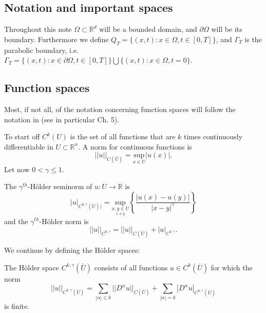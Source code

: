 \documentclass[11pt, a4paper]{article}
\begin{document}
\newpage
\begin{appendices}
\section{Notation and important spaces}
Throughout this note $\Omega \subset \mathbb{R}^d$ will be a bounded domain, and $\partial \Omega$ will be its boundary. Furthermore we define $Q_T = \{ (x,t): x \in \Omega, t\in [0,T] \}$, and $\Gamma_T$ is the parabolic boundary, i.e. $\Gamma_T = \{(x,t): x \in \partial \Omega, t \in [0,T]\} \bigcup \{(x,t): x \in \Omega, t=0\}$.

\subsection{Function spaces}
Most, if not all, of the notation concerning function spaces will follow the notation in \citep{evans} (see in particular Ch. 5).

To start off $C^k(U)$ is the set of all functions that are $k$ times continuously differentiable in $U \subset \mathbb{R}^n$. A norm for continuous functions is
\begin{equation*}
	||u||_{C(\bar{U})} = \underset{x\in U}{\text{sup}}|u(x)|.
\end{equation*}
Let now $0 < \gamma \leq 1$.
\begin{mydef}
The $\gamma^{th}$-Hölder seminorm of $u: U \to \mathbb{R}$ is
	\begin{equation*}
	|u|_{C^{0,\gamma}(\bar{U}))} = \underset{\underset{x \neq y}{x,y \in U}}{\text{sup}} \left\{\frac{|u(x)-u(y)|}{|x-y|^\gamma} \right\}
	\end{equation*}
and the $\gamma^{th}$-Hölder norm is
\begin{equation*}
||u||_{C^{0,\gamma}} = ||u||_{C(\bar{U})} + |u|_{C^{0,\gamma}}.
\end{equation*}
\end{mydef}
We continue by defining the Hölder spaces:
\begin{mydef}
The Hölder space $C^{k,\gamma}(\bar{U})$ consists of all functions $u \in C^k(\bar{U})$ for which the norm
\begin{equation*}
 ||u||_{C^{k,\gamma}(\bar{U})} = \sum_{|\alpha| \leq k}||D^\alpha u||_{C(\bar{U})} + \sum_{|\alpha| = k} |D^\alpha u|_{C^{0,\gamma}(\bar{U})}
\end{equation*}
is finite.
\end{mydef}

\end{appendices}
\end{document}
